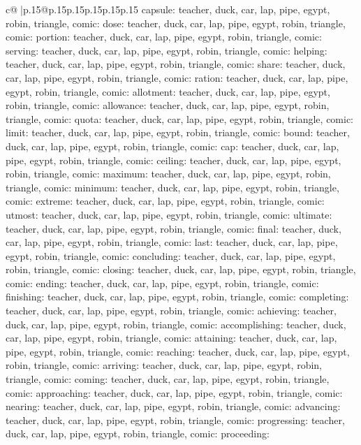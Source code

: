 \documentclass{article}
\begin{document}
{\begin{supertabular}{c@{$\;$}|p{.15\linewidth}@{}p{.15\linewidth}p{.15\linewidth}p{.15\linewidth}p{.15\linewidth}p{.15\linewidth}}
{{{capsule\nTARGETS: teacher, duck, car, lap, pipe, egypt, robin, triangle, comic\n\nCLUE: dose\nTARGETS: teacher, duck, car, lap, pipe, egypt, robin, triangle, comic\n\nCLUE: portion\nTARGETS: teacher, duck, car, lap, pipe, egypt, robin, triangle, comic\n\nCLUE: serving\nTARGETS: teacher, duck, car, lap, pipe, egypt, robin, triangle, comic\n\nCLUE: helping\nTARGETS: teacher, duck, car, lap, pipe, egypt, robin, triangle, comic\n\nCLUE: share\nTARGETS: teacher, duck, car, lap, pipe, egypt, robin, triangle, comic\n\nCLUE: ration\nTARGETS: teacher, duck, car, lap, pipe, egypt, robin, triangle, comic\n\nCLUE: allotment\nTARGETS: teacher, duck, car, lap, pipe, egypt, robin, triangle, comic\n\nCLUE: allowance\nTARGETS: teacher, duck, car, lap, pipe, egypt, robin, triangle, comic\n\nCLUE: quota\nTARGETS: teacher, duck, car, lap, pipe, egypt, robin, triangle, comic\n\nCLUE: limit\nTARGETS: teacher, duck, car, lap, pipe, egypt, robin, triangle, comic\n\nCLUE: bound\nTARGETS: teacher, duck, car, lap, pipe, egypt, robin, triangle, comic\n\nCLUE: cap\nTARGETS: teacher, duck, car, lap, pipe, egypt, robin, triangle, comic\n\nCLUE: ceiling\nTARGETS: teacher, duck, car, lap, pipe, egypt, robin, triangle, comic\n\nCLUE: maximum\nTARGETS: teacher, duck, car, lap, pipe, egypt, robin, triangle, comic\n\nCLUE: minimum\nTARGETS: teacher, duck, car, lap, pipe, egypt, robin, triangle, comic\n\nCLUE: extreme\nTARGETS: teacher, duck, car, lap, pipe, egypt, robin, triangle, comic\n\nCLUE: utmost\nTARGETS: teacher, duck, car, lap, pipe, egypt, robin, triangle, comic\n\nCLUE: ultimate\nTARGETS: teacher, duck, car, lap, pipe, egypt, robin, triangle, comic\n\nCLUE: final\nTARGETS: teacher, duck, car, lap, pipe, egypt, robin, triangle, comic\n\nCLUE: last\nTARGETS: teacher, duck, car, lap, pipe, egypt, robin, triangle, comic\n\nCLUE: concluding\nTARGETS: teacher, duck, car, lap, pipe, egypt, robin, triangle, comic\n\nCLUE: closing\nTARGETS: teacher, duck, car, lap, pipe, egypt, robin, triangle, comic\n\nCLUE: ending\nTARGETS: teacher, duck, car, lap, pipe, egypt, robin, triangle, comic\n\nCLUE: finishing\nTARGETS: teacher, duck, car, lap, pipe, egypt, robin, triangle, comic\n\nCLUE: completing\nTARGETS: teacher, duck, car, lap, pipe, egypt, robin, triangle, comic\n\nCLUE: achieving\nTARGETS: teacher, duck, car, lap, pipe, egypt, robin, triangle, comic\n\nCLUE: accomplishing\nTARGETS: teacher, duck, car, lap, pipe, egypt, robin, triangle, comic\n\nCLUE: attaining\nTARGETS: teacher, duck, car, lap, pipe, egypt, robin, triangle, comic\n\nCLUE: reaching\nTARGETS: teacher, duck, car, lap, pipe, egypt, robin, triangle, comic\n\nCLUE: arriving\nTARGETS: teacher, duck, car, lap, pipe, egypt, robin, triangle, comic\n\nCLUE: coming\nTARGETS: teacher, duck, car, lap, pipe, egypt, robin, triangle, comic\n\nCLUE: approaching\nTARGETS: teacher, duck, car, lap, pipe, egypt, robin, triangle, comic\n\nCLUE: nearing\nTARGETS: teacher, duck, car, lap, pipe, egypt, robin, triangle, comic\n\nCLUE: advancing\nTARGETS: teacher, duck, car, lap, pipe, egypt, robin, triangle, comic\n\nCLUE: progressing\nTARGETS: teacher, duck, car, lap, pipe, egypt, robin, triangle, comic\n\nCLUE: proceeding\nTARGETS: }}}
\end{supertabular}}
\end{document}

